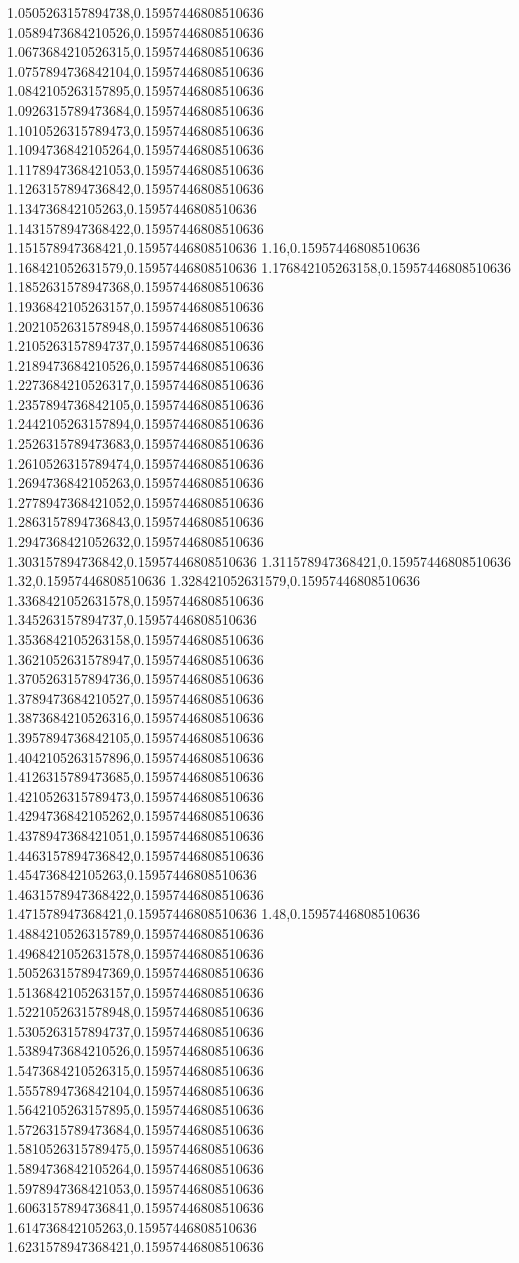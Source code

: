 1.0505263157894738,0.15957446808510636
1.0589473684210526,0.15957446808510636
1.0673684210526315,0.15957446808510636
1.0757894736842104,0.15957446808510636
1.0842105263157895,0.15957446808510636
1.0926315789473684,0.15957446808510636
1.1010526315789473,0.15957446808510636
1.1094736842105264,0.15957446808510636
1.1178947368421053,0.15957446808510636
1.1263157894736842,0.15957446808510636
1.134736842105263,0.15957446808510636
1.1431578947368422,0.15957446808510636
1.151578947368421,0.15957446808510636
1.16,0.15957446808510636
1.168421052631579,0.15957446808510636
1.176842105263158,0.15957446808510636
1.1852631578947368,0.15957446808510636
1.1936842105263157,0.15957446808510636
1.2021052631578948,0.15957446808510636
1.2105263157894737,0.15957446808510636
1.2189473684210526,0.15957446808510636
1.2273684210526317,0.15957446808510636
1.2357894736842105,0.15957446808510636
1.2442105263157894,0.15957446808510636
1.2526315789473683,0.15957446808510636
1.2610526315789474,0.15957446808510636
1.2694736842105263,0.15957446808510636
1.2778947368421052,0.15957446808510636
1.2863157894736843,0.15957446808510636
1.2947368421052632,0.15957446808510636
1.303157894736842,0.15957446808510636
1.311578947368421,0.15957446808510636
1.32,0.15957446808510636
1.328421052631579,0.15957446808510636
1.3368421052631578,0.15957446808510636
1.345263157894737,0.15957446808510636
1.3536842105263158,0.15957446808510636
1.3621052631578947,0.15957446808510636
1.3705263157894736,0.15957446808510636
1.3789473684210527,0.15957446808510636
1.3873684210526316,0.15957446808510636
1.3957894736842105,0.15957446808510636
1.4042105263157896,0.15957446808510636
1.4126315789473685,0.15957446808510636
1.4210526315789473,0.15957446808510636
1.4294736842105262,0.15957446808510636
1.4378947368421051,0.15957446808510636
1.4463157894736842,0.15957446808510636
1.454736842105263,0.15957446808510636
1.4631578947368422,0.15957446808510636
1.471578947368421,0.15957446808510636
1.48,0.15957446808510636
1.4884210526315789,0.15957446808510636
1.4968421052631578,0.15957446808510636
1.5052631578947369,0.15957446808510636
1.5136842105263157,0.15957446808510636
1.5221052631578948,0.15957446808510636
1.5305263157894737,0.15957446808510636
1.5389473684210526,0.15957446808510636
1.5473684210526315,0.15957446808510636
1.5557894736842104,0.15957446808510636
1.5642105263157895,0.15957446808510636
1.5726315789473684,0.15957446808510636
1.5810526315789475,0.15957446808510636
1.5894736842105264,0.15957446808510636
1.5978947368421053,0.15957446808510636
1.6063157894736841,0.15957446808510636
1.614736842105263,0.15957446808510636
1.6231578947368421,0.15957446808510636
